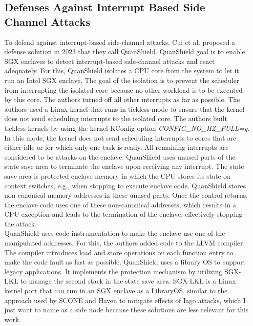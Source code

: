 \subsection{Defenses Against Interrupt Based Side Channel Attacks}
\label{sec:20:interrupt_sca}
To defend against interrupt-based side-channel attacks, Cui et al. proposed a
defense solution in 2023 that they call QuanShield.\cite{cui_quanshield_2023}
QuanShield goal is to enable SGX enclaves to detect interrupt-based side-channel
attacks and react adequately. For this, QuanShield isolates a CPU core from the
system to let it run an Intel SGX enclave. The goal of the isolation is to
prevent the scheduler from interrupting the isolated core because no other
workload is to be executed by this core. The authors turned off all other
interrupts as far as possible. The authors used a Linux kernel that runs in
tickless mode to ensure that the kernel does not send scheduling interrupts to
the isolated core. The authors built tickless kernels by using the kernel
KConfig option \textit{CONFIG\_NO\_HZ\_FULL=y}. In this mode, the kernel does
not send scheduling interrupts to cores that are either idle or for which only
one task is ready.\cite{linuxtickless} All remaining interrupts are considered
to be attacks on the enclave. QuanShield uses unused parts of the state save
area to terminate the enclave upon receiving any interrupt. The state save area
is protected enclave memory in which the CPU stores its state on context
switches, e.g., when stopping to execute enclave code. QuanShield stores
non-canonical memory addresses in these unused parts. Once the control returns,
the enclave code uses one of these non-canonical addresses, which results in a
CPU exception and leads to the termination of the enclave, effectively stopping
the attack.\\

QuanShield uses code instrumentation to make the enclave use one of the
manipulated addresses. For this, the authors added code to the LLVM compiler.
The compiler introduces load and store operations on each function entry to make
the code fault as fast as possible. QuanShield uses a library OS to support
legacy applications. It implements the protection mechanism by utilizing SGX-LKL
to manage the second stack in the state save area. SGX-LKL is a Linux kernel
port that can run in an SGX enclave as a LibraryOS, similar to the approach used
by SCONE and Haven to mitigate effects of Iago attacks, which I just want to
name as a side node because these solutions are less relevant for this
work.\cite{priebe2019sgx,arnautov_scone_2016,baumann_shielding_2015,
    checkoway2013iago}

